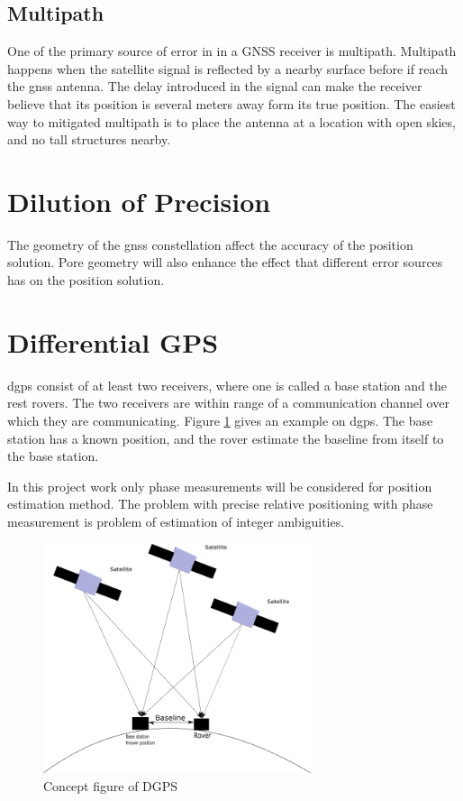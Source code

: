 \subsection{Multipath}
One of the primary source of error in in a GNSS receiver is multipath. Multipath happens when the satellite signal is reflected by a nearby surface before if reach the \gls{gnss} antenna. The delay introduced in the signal can make the receiver believe that its position is several meters away form its true position. The easiest way to mitigated multipath is to place the antenna at a location with open skies, and no tall structures nearby.
\section{Dilution of Precision}
The geometry of the \gls{gnss} constellation affect the accuracy of the position solution. Pore geometry will also enhance the effect that different error sources has on the position solution.
\section{Differential GPS}
\acrfull{dgps} consist of at least two receivers, where one is called a base station and the rest rovers. The two receivers are within range of a communication channel over which they are communicating. Figure \ref{figure:DGPS} gives an example on \gls{dgps}. The base station has a known position, and the rover estimate the baseline from itself to the base station.

In this project work only phase measurements will be considered for position estimation method.
The problem with precise relative positioning with phase measurement is problem of estimation of integer ambiguities.

\begin{figure}[H]
	\centering
		\includegraphics[width=0.7\textwidth]{figs/DGPS.png}
		\caption{Concept figure of DGPS}
		\label{figure:DGPS}
\end{figure}
